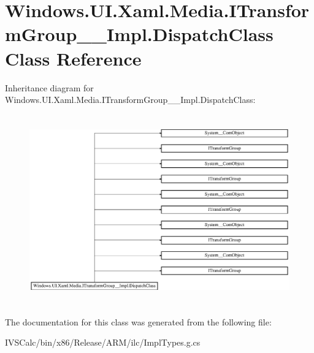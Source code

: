 \hypertarget{class_windows_1_1_u_i_1_1_xaml_1_1_media_1_1_i_transform_group_____impl_1_1_dispatch_class}{}\section{Windows.\+U\+I.\+Xaml.\+Media.\+I\+Transform\+Group\+\_\+\+\_\+\+Impl.\+Dispatch\+Class Class Reference}
\label{class_windows_1_1_u_i_1_1_xaml_1_1_media_1_1_i_transform_group_____impl_1_1_dispatch_class}
Inheritance diagram for Windows.\+U\+I.\+Xaml.\+Media.\+I\+Transform\+Group\+\_\+\+\_\+\+Impl.\+Dispatch\+Class\+:\begin{figure}[H]
\begin{center}
\leavevmode
\includegraphics[height=8.213333cm]{class_windows_1_1_u_i_1_1_xaml_1_1_media_1_1_i_transform_group_____impl_1_1_dispatch_class}
\end{center}
\end{figure}


The documentation for this class was generated from the following file\+:\begin{DoxyCompactItemize}
\item 
I\+V\+S\+Calc/bin/x86/\+Release/\+A\+R\+M/ilc/Impl\+Types.\+g.\+cs\end{DoxyCompactItemize}
